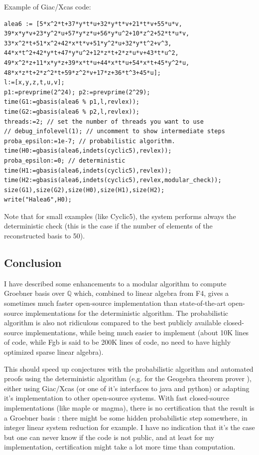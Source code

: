 \documentclass[a4paper,11pt]{article}
\begin{document}
\begin{giacjshere}
Example of Giac/Xcas code:
\begin{verbatim}
alea6 := [5*x^2*t+37*y*t*u+32*y*t*v+21*t*v+55*u*v,
39*x*y*v+23*y^2*u+57*y*z*u+56*y*u^2+10*z^2+52*t*u*v,
33*x^2*t+51*x^2+42*x*t*v+51*y^2*u+32*y*t^2+v^3,
44*x*t^2+42*y*t+47*y*u^2+12*z*t+2*z*u*v+43*t*u^2,
49*x^2*z+11*x*y*z+39*x*t*u+44*x*t*u+54*x*t+45*y^2*u,
48*x*z*t+2*z^2*t+59*z^2*v+17*z+36*t^3+45*u];
l:=[x,y,z,t,u,v];
p1:=prevprime(2^24); p2:=prevprime(2^29);
time(G1:=gbasis(alea6 % p1,l,revlex));
time(G2:=gbasis(alea6 % p2,l,revlex));
threads:=2; // set the number of threads you want to use
// debug_infolevel(1); // uncomment to show intermediate steps
proba_epsilon:=1e-7; // probabilistic algorithm.
time(H0:=gbasis(alea6,indets(cyclic5),revlex));
proba_epsilon:=0; // deterministic
time(H1:=gbasis(alea6,indets(cyclic5),revlex));
time(H2:=gbasis(alea6,indets(cyclic5),revlex,modular_check));
size(G1),size(G2),size(H0),size(H1),size(H2);
write("Halea6",H0);
\end{verbatim}
Note that for small examples (like Cyclic5), the system performs always the deterministic
check (this is the case if the number of elements of the reconstructed basis
to 50).

\subsection{Conclusion}
I have described some enhancements to a modular algorithm
to compute Groebner basis over $\mathbb{Q}$ which, combined to 
linear algebra from F4, gives
a sometimes much faster open-source implementation 
than state-of-the-art open-source implementations 
for the deterministic algorithm. 
The probabilistic algorithm is also not ridiculous
compared to the best publicly available closed-source implementations,
while being much easier to implement
(about 10K lines of code, while Fgb is said to be 200K lines of code,
no need to have highly optimized sparse linear algebra).

This should speed up conjectures with the probabilistic algorithm
and automated proofs using the deterministic
algorithm (e.g. for the Geogebra theorem prover
\cite{botanaimplementing}), 
either using Giac/Xcas (or one of it's interfaces
to java and python) or adapting it's implementation
to other open-source systems.
With fast closed-source implementations (like maple or magma), 
there is no certification that the result is a Groebner basis :
there might be some hidden probabilistic
step somewhere, in integer linear system reduction for example. I have
no indication that it's the case but one can never know if the code is
not public, and at least for my implementation, certification
might take a lot more time than computation. 


\end{giacjshere}
\end{document}
